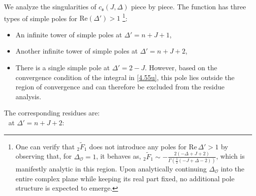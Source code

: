 We analyze the singularities of \(c_{\mathfrak{s}}(J,\Delta)\) piece by piece. The function has three types of simple poles for \(\mathrm{Re}(\Delta') > 1\) \footnote{One can verify that \({_2}\tilde{F}_1\) does not introduce any poles for \(\mathrm{Re}\,\Delta' > 1\) by observing that, for \(\Delta_{\mathcal{O}} = 1\), it behaves as,
${_2}\tilde{F}_1 \sim -\frac{2 (-\Delta + J + 2)}{\Gamma \left( \frac{1}{2} (-J + \Delta - 2) \right)}$,
which is manifestly analytic in this region. Upon analytically continuing \(\Delta_{\mathcal{O}}\) into the entire complex plane while keeping its real part fixed, no additional pole structure is expected to emerge.
}:
\begin{itemize}
    \item  An infinite tower of simple poles at \(\Delta' = n+J+1\),
\item Another infinite tower of simple poles at \(\Delta' =n+J+2\),
\item There is a single simple pole at \(\Delta' = 2 - J\). However, based on the convergence condition of the integral in \eqref{4.55u}, this pole lies outside the region of convergence and can therefore be excluded from the residue analysis.
\end{itemize}
The corresponding residues are:\\
\textbullet $\,\,$ at $\Delta' = n+J+2:$
\begingroup\tiny
